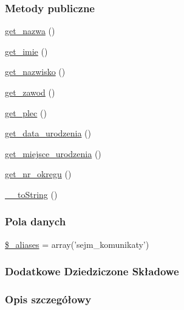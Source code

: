 \subsubsection*{Metody publiczne}
\begin{DoxyCompactItemize}
\item 
\hyperlink{classep___sejm___komunikat_ac0818f0049d7b84f08f77128f54cee36}{get\-\_\-nazwa} ()
\item 
\hyperlink{classep___sejm___komunikat_ac4b0c85dc2a130038f2d118dbd0c3d77}{get\-\_\-imie} ()
\item 
\hyperlink{classep___sejm___komunikat_abdd1d7ff92508da7f748ba1feec97af0}{get\-\_\-nazwisko} ()
\item 
\hyperlink{classep___sejm___komunikat_af80ca8310b60004454dd02a387deaa2c}{get\-\_\-zawod} ()
\item 
\hyperlink{classep___sejm___komunikat_ac7f9af5c3fa024e4c26a7b6bd4ce4bb4}{get\-\_\-plec} ()
\item 
\hyperlink{classep___sejm___komunikat_a880b240cd2d8c336fd1709bf0cb1ae2c}{get\-\_\-data\-\_\-urodzenia} ()
\item 
\hyperlink{classep___sejm___komunikat_ac57c08ec5e394a19c5bd9280c8376182}{get\-\_\-miejsce\-\_\-urodzenia} ()
\item 
\hyperlink{classep___sejm___komunikat_a2645a9f0aa5b0ccc482943348c033d0a}{get\-\_\-nr\-\_\-okregu} ()
\item 
\hyperlink{classep___sejm___komunikat_a7516ca30af0db3cdbf9a7739b48ce91d}{\-\_\-\-\_\-to\-String} ()
\end{DoxyCompactItemize}
\subsubsection*{Pola danych}
\begin{DoxyCompactItemize}
\item 
\hyperlink{classep___sejm___komunikat_ab4e31d75f0bc5d512456911e5d01366b}{\$\-\_\-aliases} = array('sejm\-\_\-komunikaty')
\end{DoxyCompactItemize}
\subsubsection*{Dodatkowe Dziedziczone Składowe}


\subsubsection{Opis szczegółowy}


